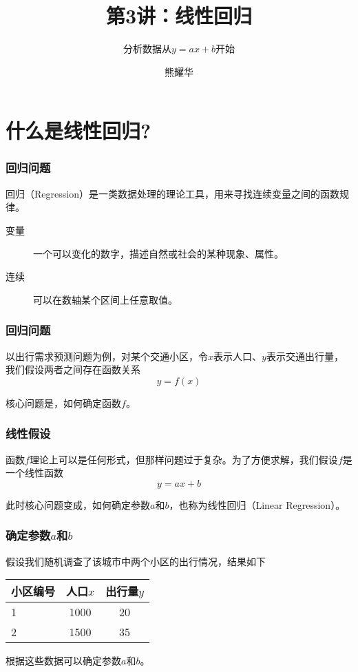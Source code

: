 \documentclass[14pt]{beamer}
\title{第3讲：线性回归}
\subtitle{分析数据从$y=ax+b$开始}
\author{熊耀华}
\institute{交通工程系}
\begin{document}
\begin{frame}
    \titlepage
\end{frame}

\section{什么是线性回归?}

\begin{frame}
    \frametitle{回归问题}

    回归（Regression）是一类数据处理的理论工具，用来寻找连续变量之间的函数规律。

    \begin{description}
        \item[变量] 一个可以变化的数字，描述自然或社会的某种现象、属性。
        \item[连续] 可以在数轴某个区间上任意取值。
    \end{description}
\end{frame}

\begin{frame}
    \frametitle{回归问题}
    以出行需求预测问题为例，对某个交通小区，令$x$表示人口、$y$表示交通出行量，我们假设两者之间存在函数关系
        \[ y = f(x) \]

    核心问题是，如何确定函数$f$。
\end{frame}

\begin{frame}
    \frametitle{线性假设}
    函数$f$理论上可以是任何形式，但那样问题过于复杂。为了方便求解，我们假设$f$是一个线性函数
    \[y=ax+b\]

    此时核心问题变成，如何确定参数$a$和$b$，也称为线性回归（Linear Regression）。
\end{frame}

\begin{frame}
    \frametitle{确定参数$a$和$b$}
    假设我们随机调查了该城市中两个小区的出行情况，结果如下
    \begin{table}
        \begin{tabular}{l c c}
            小区编号 & 人口$x$ & 出行量$y$ \\
            \hline\hline
            1   & 1000  & 20 \\
            2   & 1500  & 35 \\
            
        \end{tabular}
    \end{table}

    根据这些数据可以确定参数$a$和$b$。
\end{frame}
\end{document}
